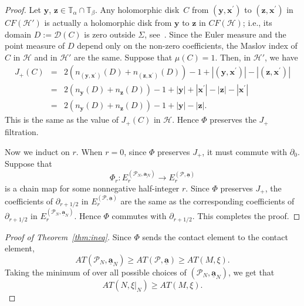 \documentclass[11pt,oneside,english]{amsart}
\numberwithin{equation}{section}
\numberwithin{figure}{section}
\theoremstyle{definition}
\theoremstyle{plain}
\theoremstyle{plain}
\theoremstyle{remark}
\theoremstyle{plain}
\begin{document}
\begin{proof}
Let ${\mathbf{y}}$, ${\mathbf{z}} \in {\mathbb{T}}_{\alpha} \cap {\mathbb{T}}_{\beta}$. Any holomorphic disk~$C$ from
$(\mathbf{y},\mathbf{x}^{\prime})$ to $(\mathbf{z},\mathbf{x}^{\prime})$ in ${\mathit{CF}}({\mathcal{H}}')$
is actually a holomorphic disk from $\mathbf{y}$ to $\mathbf{z}$
in ${\mathit{CF}}({\mathcal{H}})$; i.e., its domain $D:={\mathcal{D}}(C)$ is zero outside $\Sigma$, see~\cite{key-2}.
Since the Euler measure and the point measure of $D$ depend only on the non-zero coefficients,
the Maslov index of $C$ in ${\mathcal{H}}$ and in ${\mathcal{H}}'$ are the same. Suppose that $\mu(C) = 1$.
Then, in ${\mathcal{H}}'$, we have
\begin{eqnarray*}
J_{+}(C) & = & 2(n_{(\mathbf{y},\mathbf{x}^{\prime})}(D)+n_{(\mathbf{z},\mathbf{x}^{\prime})}(D))-1+|(\mathbf{y},\mathbf{x}^{\prime})|-|(\mathbf{z},\mathbf{x}^{\prime})|\\
 & = & 2(n_{\mathbf{y}}(D)+n_{\mathbf{z}}(D))-1+|\mathbf{y}|+|\mathbf{x}^{\prime}|-|\mathbf{z}|-|\mathbf{x}^{\prime}|\\
 & = & 2(n_{\mathbf{y}}(D)+n_{\mathbf{z}}(D))-1+|\mathbf{y}|-|\mathbf{z}|.
\end{eqnarray*}
This is the same as the value of $J_{+}(C)$ in ${\mathcal{H}}$.
Hence $\Phi$ preserves the $J_{+}$ filtration.

Now we induct on $r$. When $r=0$, since $\Phi$ preserves $J_{+}$,
it must commute with $\partial_{0}$. Suppose that
\[
\Phi_r  \colon E_{r}^{(\mathcal{P}_{N},\underline{\mathbf{a}_{N}})}\rightarrow E_{r}^{(\mathcal{P},\underline{\mathbf{a}})}
\]
is a chain map for some nonnegative half-integer $r$. Since $\Phi$
preserves $J_{+}$, the coefficients of $\partial_{r+1/2}$ in $E_{r}^{(\mathcal{P},\underline{\mathbf{a}})}$
are the same as the corresponding coefficients of $\partial_{r+1/2}$
in $E_{r}^{(\mathcal{P}_{N},\underline{\mathbf{a}}_{N})}$. Hence
$\Phi$ commutes with $\partial_{r+1/2}$. This completes the proof.
\end{proof}

\begin{proof}[Proof of Theorem~\ref{thm:ineq}]
Since $\Phi$ sends the contact element to the contact
element,
\[
{\mathit{AT}}(\mathcal{P}_{N},\underline{\mathbf{a}}_{N})\ge {\mathit{AT}}(\mathcal{P},\underline{\mathbf{a}})\ge {\mathit{AT}}(M,\xi).
\]
Taking the minimum of over all possible choices of $(\mathcal{P}_{N},\underline{\mathbf{a}}_{N})$,
we get that
\[
{\mathit{AT}}(N,\xi|_{N})\ge {\mathit{AT}}(M,\xi).
\]
\end{proof}
\end{document}
